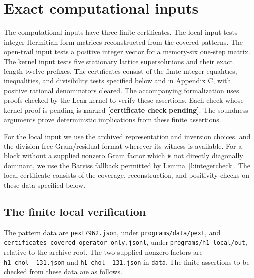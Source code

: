 
\section{Exact computational inputs}

The computational inputs have three finite certificates. The local
input tests integer Hermitian-form matrices reconstructed from the
covered patterns. The open-trail input tests a positive integer
vector for a memory-six one-step matrix. The kernel input
tests five stationary lattice supersolutions and their exact
length-twelve prefixes. The certificates consist of the finite
integer equalities, inequalities, and divisibility tests specified
below and in Appendix C, with positive rational denominators cleared.
The accompanying formalization uses proofs checked by the Lean
kernel to verify these assertions. Each check whose kernel proof is
pending is marked \textbf{[certificate check pending]}. The soundness
arguments prove deterministic implications from these finite assertions.

For the local input we use the archived representation and inversion
choices, and the division-free Gram/residual format wherever its
witness is available. For a block without a supplied nonzero Gram
factor which is not directly diagonally dominant, we use the
Bareiss fallback permitted by Lemma~\ref{l:integercheck}. The local
certificate consists of the coverage, reconstruction, and positivity
checks on these data specified below.

\subsection*{The finite local verification}
The pattern data are \texttt{pext7962.json}, under
\texttt{programs/data/pext}, and
\texttt{certificates\_covered\_operator\_only.jsonl}, under
\texttt{programs/h1-local/out}, relative to the archive root.
The two supplied nonzero factors are
\texttt{h1\_chol\_\_\allowbreak131.json} and
\texttt{h1\_chol\_\_\allowbreak131.json} in \texttt{data}.
The finite assertions to be checked from these data are as follows.

